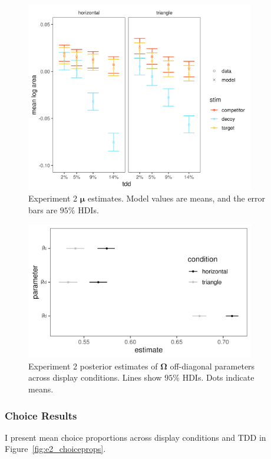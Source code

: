 \begin{figure}
   \includegraphics[width=100mm]{figures/bayes_circle_area_mu_sigma_constant_comp_effect_model_v_data_collapsed.jpeg}
   \caption{Experiment 2 $\boldsymbol{\mu}$ estimates. Model values are means, and the error bars are $95\%$ HDIs.}
   \label{fig:e2mu}
\end{figure}

\begin{figure}
   \includegraphics[width=100mm]{figures/bayes_circle_area_sigma_constant_comp_effect_omega_plot.jpeg}
   \caption{Experiment 2 posterior estimates of $\boldsymbol{\Omega}$ off-diagonal parameters across display conditions. Lines show $95\%$ HDIs.  Dots indicate means.}
   \label{fig:e2_omega}
\end{figure}

\subsubsection{Choice Results}

I present mean choice proportions across display conditions and TDD in Figure~\ref{fig:e2_choiceprops}. 

